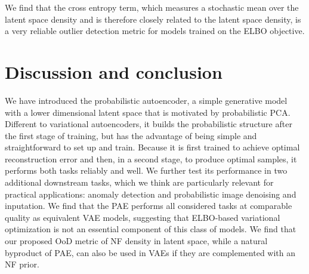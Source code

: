 \documentclass[10pt]{article} \usepackage[accepted]{tmlr}
\begin{document}
We find that the cross entropy term, which measures a stochastic mean over the latent space density and is therefore closely related to the latent space density, is a very reliable outlier detection metric for models trained on the ELBO objective.
\begin{table}[h]
\caption{\label{tab:ELBO_auroc}  Dissecting out-of-distribution detection with the ELBO. Error estimates obtained through bootstrapping.}
\end{table}



\section{Discussion and conclusion}
We have introduced the probabilistic autoencoder, a simple generative model with a lower dimensional latent space that is motivated by probabilistic PCA. Different to variational autoencoders, it builds 
the probabilistic structure after the 
first stage of training, but 
has the advantage of being simple and straightforward to set up and train. Because it is first trained to achieve optimal reconstruction error and then, in a second stage, to produce optimal samples, it performs both tasks reliably and well.  We further test its performance in two additional downstream tasks, which we think are particularly relevant for practical applications: anomaly detection and probabilistic image denoising and inputation. 
We find that the PAE performs all considered tasks at comparable quality as equivalent VAE models, suggesting that 
ELBO-based variational optimization is not 
an essential component of this class of models. We find that our proposed OoD metric of NF density in latent space, 
while a natural byproduct of PAE, can also 
be used in VAEs if they are complemented with an NF prior.
  

\appendix
\end{document}

